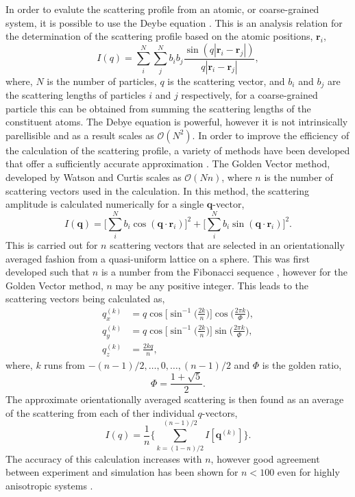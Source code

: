 In order to evalute the scattering profile from an atomic, or coarse-grained system, it is possible to use the Deybe equation \cite{Debye1915}. 
This is an analysis relation for the determination of the scattering profile based on the atomic positions, $\mathbf{r}_i$,
%
\begin{equation}
	I(q) = \sum_{i}^{N}\sum_{j}^{N} b_ib_j\frac{\sin{(q|\mathbf{r}_i-\mathbf{r}_j|)}}{q|\mathbf{r}_i-\mathbf{r}_j|},
\end{equation}
%
where, $N$ is the number of particles, $q$ is the scattering vector, and $b_i$ and $b_j$ are the scattering lengths of particles $i$ and $j$ respectively, for a coarse-grained particle this can be obtained from summing the scattering lengths of the constituent atoms. 
The Debye equation is powerful, however it is not intrinsically parellisible and as a result scales as $\mathcal{O}(N^2)$. 
In order to improve the efficiency of the calculation of the scattering profile, a variety of methods have been developed that offer a sufficiently accurate approximation \cite{Svergun1994,Watson2013}.
The Golden Vector method, developed by Watson and Curtis \cite{Watson2013} scales as $\mathcal{O}(Nn)$, where $n$ is the number of scattering vectors used in the calculation. 
In this method, the scattering amplitude is calculated numerically for a single $\mathbf{q}$-vector, 
%
\begin{equation}
	I(\mathbf{q}) = \Bigg[\sum_{i}^{N}b_i\cos{(\mathbf{q}\cdot\mathbf{r}_i)}\Bigg]^2 + \Bigg[\sum_{i}^{N}b_i\sin{(\mathbf{q}\cdot\mathbf{r}_i)}\Bigg]^2.
\end{equation}
%
This is carried out for $n$ scattering vectors that are selected in an orientationally averaged fashion from a quasi-uniform lattice on a sphere. 
This was first developed such that $n$ is a number from the Fibonacci sequence \cite{Svergun1994}, however for the Golden Vector method, $n$ may be any positive integer. 
This leads to the scattering vectors being calculated as, 
%
\begin{equation}
	\begin{aligned}
		q_x^{(k)} & = q\cos\Bigg[\sin^{-1}\bigg(\frac{2k}{n}\bigg)\Bigg]\cos\bigg(\frac{2\pi k}{\Phi}\bigg), \\
		q_y^{(k)} & = q\cos\Bigg[\sin^{-1}\bigg(\frac{2k}{n}\bigg)\Bigg]\sin\bigg(\frac{2\pi k}{\Phi}\bigg), \\
		q_z^{(k)} & = \frac{2 k q}{n}, 
	\end{aligned}
\end{equation}
%
where, $k$ runs from $-(n-1)/2,\ldots,0,\ldots,(n-1)/2$ and $\Phi$ is the golden ratio, 
%
\begin{equation}
	\Phi = \frac{1+\sqrt{5}}{2}.
\end{equation}
%
The approximate orientationally averaged scattering is then found as an average of the scattering from each of ther individual $q$-vectors, 
%
\begin{equation}
	I(q) = \frac{1}{n}\Bigg\{\sum_{k=(1-n)/2}^{(n-1)/2} I[\mathbf{q}^{(k)}]\Bigg\}.
\end{equation}
%
The accuracy of this calculation increases with $n$, however good agreement between experiment and simulation has been shown for $n < 100$ even for highly anisotropic systems \cite{Watson2013}. 



